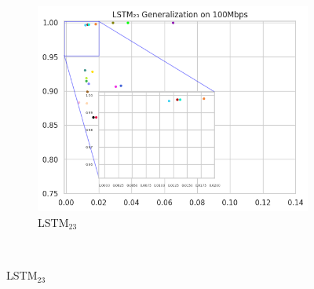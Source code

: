 \documentclass[a4paper,fleqn]{cas-sc}
\begin{document}
\begin{figure}[h!]
\begin{minipage}[t]{0.46\textwidth}
\begin{subfigure}[t]{0.33\textwidth}
				\includegraphics[draft=false, width=\textwidth]{./figs/Generalizacao-LSTM23-100Mbps.png} 
				\caption{LSTM$_{23}$}
				\label{fig:Generalizacao-LSTM23-100Mbps}
			\end{subfigure}%
			~%
			

\end{minipage}
\end{figure}
\end{document}
